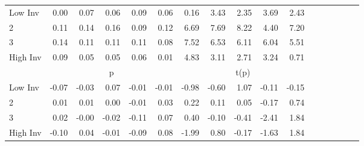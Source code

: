 \begin{table}[h]
\begin{tabular}{lrrrrrrrrrrrrrrrr}
    \\
      \cmidrule(r){2-5} \cmidrule(r){6-9} \cmidrule(r){10-13} \cmidrule(r){14-17}

    Low Inv   & 0.00  & 0.07  & 0.06  & 0.09  & 0.06  & 0.16  & 3.43  & 2.35  & 3.69  & 2.43  \\
           2  & 0.11  & 0.14  & 0.16  & 0.09  & 0.12  & 6.69  & 7.69  & 8.22  & 4.40  & 7.20  \\
           3  & 0.14  & 0.11  & 0.11  & 0.11  & 0.08  & 7.52  & 6.53  & 6.11  & 6.04  & 5.51  \\
    High Inv  & 0.09  & 0.05  & 0.05  & 0.06  & 0.01  & 4.83  & 3.11  & 2.71  & 3.24  & 0.71  \\

  
    
      & \multicolumn{5}{c}{p} & \multicolumn{5}{c}{t(p)}
    
    \\
      \cmidrule(r){2-5} \cmidrule(r){6-9} \cmidrule(r){10-13} \cmidrule(r){14-17}

    Low Inv   & -0.07  & -0.03  & 0.07  & -0.01  & -0.01  & -0.98  & -0.60  & 1.07  & -0.11  & -0.15  \\
           2  & 0.01  & 0.01  & 0.00  & -0.01  & 0.03  & 0.22  & 0.11  & 0.05  & -0.17  & 0.74  \\
           3  & 0.02  & -0.00  & -0.02  & -0.11  & 0.07  & 0.40  & -0.10  & -0.41  & -2.41  & 1.84  \\
    High Inv  & -0.10  & 0.04  & -0.01  & -0.09  & 0.08  & -1.99  & 0.80  & -0.17  & -1.63  & 1.84  \\

  

  \bottomrule
\end{tabular}
\label{tbl:25_Size_BM_Inv_B2016}
\end{table}